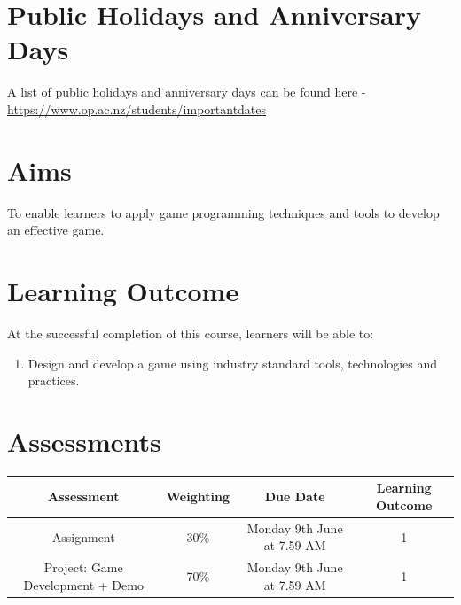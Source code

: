\documentclass{article}
\begin{document}
\section*{Public Holidays and Anniversary Days}
A list of public holidays and anniversary days can be found here - \href{https://www.op.ac.nz/students/importantdates}{https://www.op.ac.nz/students/importantdates}

\section*{Aims}
To enable learners to apply game programming techniques and tools to develop an effective game.

\section*{Learning Outcome}
At the successful completion of this course, learners will be able to:
\begin{enumerate}
	\item Design and develop a game using industry standard tools, technologies and practices.
\end{enumerate}

\section*{Assessments}
\renewcommand{\arraystretch}{1.5}
\begin{tabular}{|c|c|c|c|}
	\hline
	\textbf{Assessment}                                 & \textbf{Weighting} & \textbf{Due Date}            & \textbf{Learning Outcome} \\ \hline
	\small Assignment                 & \small 30\%        & \small Monday 9th June at 7.59 AM \small  & \small 1                   \\ \hline
	\small Project: Game Development + Demo                 & \small 70\%        & \small Monday 9th June at 7.59 AM \small  & \small 1                   \\ \hline
\end{tabular}
\end{document}
